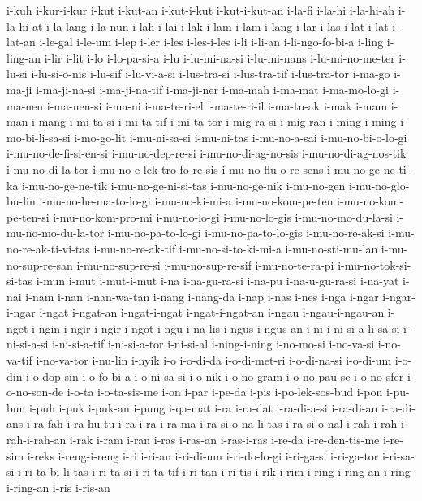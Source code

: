 {i-kuh i-kur-i-kur i-kut i-kut-an i-kut-i-kut i-kut-i-kut-an i-la-fi
i-la-hi i-la-hi-ah i-la-hi-at i-la-lang i-la-nun i-lah i-lai i-lak
i-lam-i-lam i-lang i-lar i-las i-lat i-lat-i-lat-an i-le-gal i-le-um i-lep
i-ler i-les i-les-i-les i-li i-li-an i-li-ngo-fo-bi-a i-ling i-ling-an
i-lir i-lit i-lo i-lo-pa-si-a i-lu i-lu-mi-na-si i-lu-mi-nans
i-lu-mi-no-me-ter i-lu-si i-lu-si-o-nis i-lu-sif i-lu-vi-a-si i-lus-tra-si
i-lus-tra-tif i-lus-tra-tor i-ma-go i-ma-ji i-ma-ji-na-si i-ma-ji-na-tif
i-ma-ji-ner i-ma-mah i-ma-mat i-ma-mo-lo-gi i-ma-nen i-ma-nen-si i-ma-ni
i-ma-te-ri-el i-ma-te-ri-il i-ma-tu-ak i-mak i-mam i-man i-mang i-mi-ta-si
i-mi-ta-tif i-mi-ta-tor i-mig-ra-si i-mig-ran i-ming-i-ming
i-mo-bi-li-sa-si i-mo-go-lit i-mu-ni-sa-si i-mu-ni-tas i-mu-no-a-sai
i-mu-no-bi-o-lo-gi i-mu-no-de-fi-si-en-si i-mu-no-dep-re-si
i-mu-no-di-ag-no-sis i-mu-no-di-ag-nos-tik i-mu-no-di-la-tor
i-mu-no-e-lek-tro-fo-re-sis i-mu-no-flu-o-re-sens i-mu-no-ge-ne-ti-ka
i-mu-no-ge-ne-tik i-mu-no-ge-ni-si-tas i-mu-no-ge-nik i-mu-no-gen
i-mu-no-glo-bu-lin i-mu-no-he-ma-to-lo-gi i-mu-no-ki-mi-a
i-mu-no-kom-pe-ten i-mu-no-kom-pe-ten-si i-mu-no-kom-pro-mi i-mu-no-lo-gi
i-mu-no-lo-gis i-mu-no-mo-du-la-si i-mu-no-mo-du-la-tor
i-mu-no-pa-to-lo-gi i-mu-no-pa-to-lo-gis i-mu-no-re-ak-si
i-mu-no-re-ak-ti-vi-tas i-mu-no-re-ak-tif i-mu-no-si-to-ki-mi-a
i-mu-no-sti-mu-lan i-mu-no-sup-re-san i-mu-no-sup-re-si i-mu-no-sup-re-sif
i-mu-no-te-ra-pi i-mu-no-tok-si-si-tas i-mun i-mut i-mut-i-mut i-na
i-na-gu-ra-si i-na-pu i-na-u-gu-ra-si i-na-yat i-nai i-nam i-nan
i-nan-wa-tan i-nang i-nang-da i-nap i-nas i-nes i-nga i-ngar i-ngar-i-ngar
i-ngat i-ngat-an i-ngat-i-ngat i-ngat-i-ngat-an i-ngau i-ngau-i-ngau-an
i-nget i-ngin i-ngir-i-ngir i-ngot i-ngu-i-na-lis i-ngus i-ngus-an i-ni
i-ni-si-a-li-sa-si i-ni-si-a-si i-ni-si-a-tif i-ni-si-a-tor i-ni-si-al
i-ning-i-ning i-no-mo-si i-no-va-si i-no-va-tif i-no-va-tor i-nu-lin
i-nyik i-o i-o-di-da i-o-di-met-ri i-o-di-na-si i-o-di-um i-o-din
i-o-dop-sin i-o-fo-bi-a i-o-ni-sa-si i-o-nik i-o-no-gram i-o-no-pau-se
i-o-no-sfer i-o-no-son-de i-o-ta i-o-ta-sis-me i-on i-par i-pe-da i-pis
i-po-lek-sos-bud i-pon i-pu-bun i-puh i-puk i-puk-an i-pung i-qa-mat i-ra
i-ra-dat i-ra-di-a-si i-ra-di-an i-ra-di-ans i-ra-fah i-ra-hu-tu i-ra-i-ra
i-ra-ma i-ra-si-o-na-li-tas i-ra-si-o-nal i-rah-i-rah i-rah-i-rah-an i-rak
i-ram i-ran i-ras i-ras-an i-ras-i-ras i-re-da i-re-den-tis-me i-re-sim
i-reks i-reng-i-reng i-ri i-ri-an i-ri-di-um i-ri-do-lo-gi i-ri-ga-si
i-ri-ga-tor i-ri-sa-si i-ri-ta-bi-li-tas i-ri-ta-si i-ri-ta-tif i-ri-tan
i-ri-tis i-rik i-rim i-ring i-ring-an i-ring-i-ring-an i-ris i-ris-an
}
